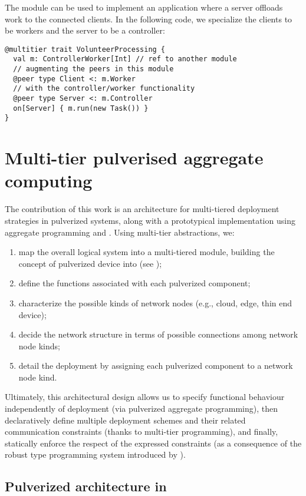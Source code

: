 The module can be used to implement an application where a server offloads work
 to the connected clients. In the following code, 
we specialize the clients to be workers and the server to be a controller:

\begin{verbatim}
@multitier trait VolunteerProcessing {
  val m: ControllerWorker[Int] // ref to another module
  // augmenting the peers in this module
  @peer type Client <: m.Worker
  // with the controller/worker functionality
  @peer type Server <: m.Controller    
  on[Server] { m.run(new Task()) }
}
\end{verbatim}

\section{Multi-tier pulverised aggregate computing}
\label{multitier+pulverisation}

The contribution of this work is an architecture for multi-tiered deployment strategies in pulverized systems,
along with a prototypical implementation using aggregate programming and \scalaloci{}.
% 
Using multi-tier abstractions, we: 
\begin{enumerate}
  \item map the overall logical system into a multi-tiered module, building the concept of pulverized device into \scalaloci{} (see );
  \item define the functions associated with each pulverized component;
  \item characterize the possible kinds of network nodes (e.g., cloud, edge, thin end device);
  \item decide the network structure in terms of possible connections among network node kinds;
  \item detail the deployment by assigning each pulverized component to a network node kind. 
\end{enumerate}

Ultimately, this architectural design allows us to specify functional behaviour independently of deployment
(via pulverized aggregate programming),
then declaratively define multiple deployment schemes and their related communication constraints
(thanks to multi-tier programming),
and finally, statically enforce the respect of the expressed constraints
(as a consequence of the robust type programming system introduced by \scalaloci{}).

\subsection{Pulverized architecture in \scalaloci{}}

